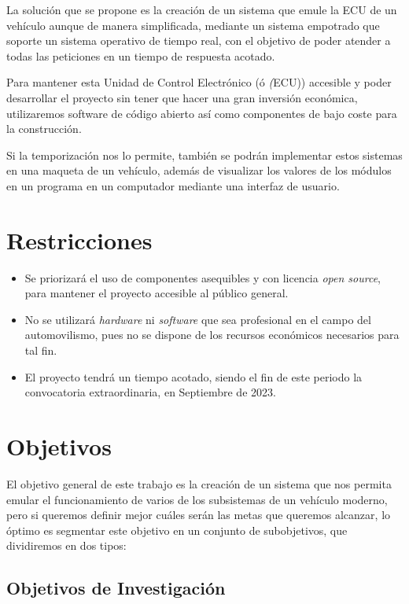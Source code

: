 La solución que se propone es la creación de un sistema que emule la ECU de un vehículo aunque de manera simplificada, mediante un sistema empotrado que soporte un sistema operativo de tiempo real, con el objetivo de poder atender a todas las peticiones en un tiempo de respuesta acotado. 

Para mantener esta Unidad de Control Electrónico (ó \textit(ECU)) accesible y poder desarrollar el proyecto sin tener que hacer una gran inversión económica, utilizaremos software de código abierto así como componentes de bajo coste para la construcción.

Si la temporización nos lo permite, también se podrán implementar estos sistemas en una maqueta de un vehículo, además de visualizar los valores de los módulos en un programa en un computador mediante una interfaz de usuario.


\section{Restricciones}

\begin{itemize}
\item Se priorizará el uso de componentes asequibles y con licencia \textit{open source}, para mantener el proyecto accesible al público general.
\item No se utilizará \textit{hardware} ni \textit{software} que sea profesional en el campo del automovilismo, pues no se dispone de los recursos económicos necesarios para tal fin.
\item El proyecto tendrá un tiempo acotado, siendo el fin de este periodo la convocatoria extraordinaria, en Septiembre de 2023.

\end{itemize}


\section{Objetivos}

El objetivo general de este trabajo es la creación de un sistema que nos permita emular el funcionamiento de varios de los subsistemas de un vehículo moderno, pero si queremos definir mejor cuáles serán las metas que queremos alcanzar, lo óptimo es segmentar este objetivo en un conjunto de subobjetivos, que dividiremos en dos tipos:
\newpage

\subsection{Objetivos de Investigación}


